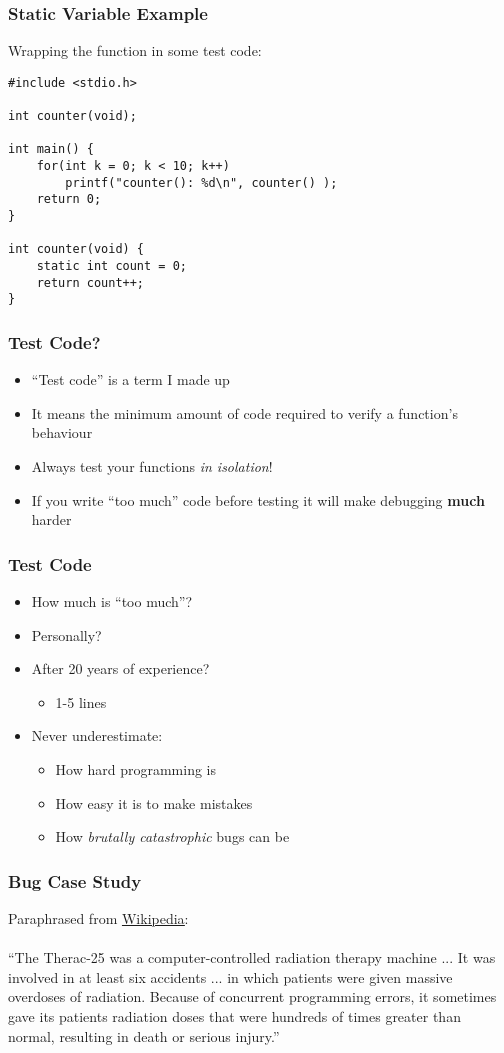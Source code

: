 \documentclass[14pt]{beamer}
\begin{document}
\begin{frame}[fragile]
\frametitle{Static Variable Example}
Wrapping the function in some test code:
\begin{lstlisting}[style=CStyle]
#include <stdio.h>

int counter(void);

int main() {
	for(int k = 0; k < 10; k++)
		printf("counter(): %d\n", counter() );
	return 0;
}

int counter(void) {
	static int count = 0;
	return count++;
}
\end{lstlisting}
\end{frame}

\begin{frame}
\frametitle{Test Code?}
\begin{itemize}
\item ``Test code'' is a term I made up
\item It means the minimum amount of code required to verify a function's behaviour
\item Always test your functions \textit{in isolation}!
\pause
\item If you write ``too much'' code before testing it will make debugging \textbf{much} harder
\end{itemize}
\end{frame}

\begin{frame}
\frametitle{Test Code}
\begin{itemize}
\item How much is ``too much''?
\pause
\item Personally?
\pause
\item After 20 years of experience?
\pause
	\begin{itemize}
		\item 1-5 lines
	\end{itemize}
\pause
\item Never underestimate:
	\begin{itemize}
		\item How hard programming is
		\item How easy it is to make mistakes
		\item How \textit{brutally catastrophic} bugs can be
	\end{itemize}
\end{itemize}
\end{frame}

\begin{frame}
\frametitle{Bug Case Study}
Paraphrased from \underline{\href{https://en.wikipedia.org/wiki/Therac-25}{Wikipedia}}:
\\~\\
``The Therac-25 was a computer-controlled radiation therapy machine ... It was involved in at least six accidents ...  in which patients were given massive overdoses of radiation. Because of concurrent programming errors, it sometimes gave its patients radiation doses that were hundreds of times greater than normal, resulting in death or serious injury.''
\end{frame}
\end{document}
